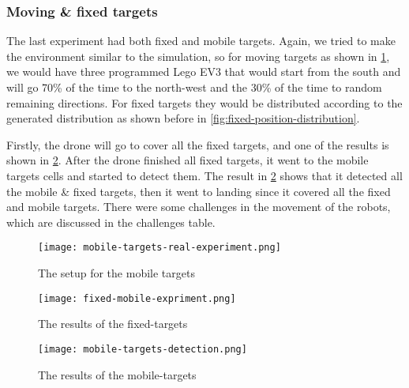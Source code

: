 \documentclass[../main.tex]{subfiles}
\begin{document}
\subsubsection{Moving \& fixed targets}

The last experiment had both fixed and mobile targets.
Again, we tried to make the environment similar to the 
simulation, so for moving targets as shown in 
\cref{fig:mobile-targets-real-experiment}, we would have 
three programmed Lego EV3 that would start 
from the south and will go 70\% of the time to the north-west 
and the 30\% of the time to random remaining directions. For fixed
targets they would be distributed according to the generated distribution
as shown before in \cref{fig:fixed-position-distribution}.

Firstly, the drone will go to cover all the fixed targets, and one of the 
results is shown in \cref{fig:fixed-mobile-expriment}. After the 
drone finished all fixed targets, it went to the mobile targets cells and
started to detect them. The result in \cref{fig:fixed-mobile-expriment} 
shows that it detected all the mobile \& fixed targets, 
then it went to landing since it covered all the fixed and mobile targets.
There were some challenges in the movement of the robots, which are 
discussed in the challenges table.

\begin{figure}[H]
	\centering
	\texttt{[image: mobile-targets-real-experiment.png]}
	\caption{The setup for the mobile targets}
	\label{fig:mobile-targets-real-experiment}
\end{figure}

\begin{figure}[H]
	\centering
	\texttt{[image: fixed-mobile-expriment.png]}
	\caption{The results of the fixed-targets}
	\label{fig:fixed-mobile-expriment}
\end{figure}

\begin{figure}[H]
	\centering
	\texttt{[image: mobile-targets-detection.png]}
	\caption{The results of the mobile-targets}
	\label{fig:mobile-expriment-detection}
\end{figure}

\end{document}
